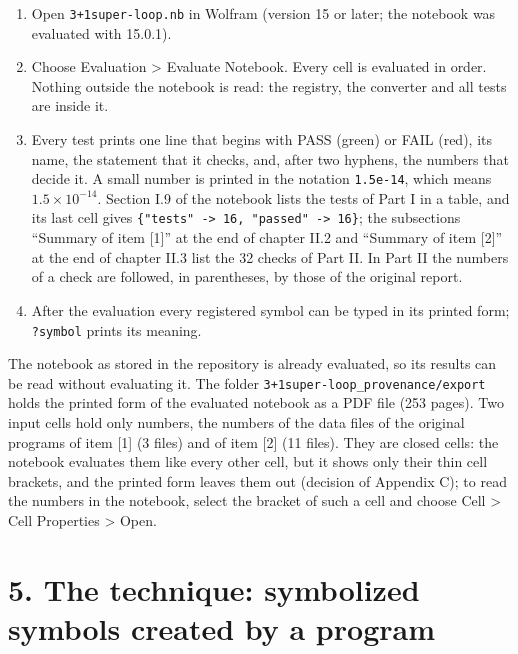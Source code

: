 \documentclass[
  10pt,
]{article}
\providecommand{\tightlist}{%
  \setlength{\itemsep}{0pt}\setlength{\parskip}{0pt}}
\begin{document}
\begin{enumerate}
\def\labelenumi{\arabic{enumi}.}
\tightlist
\item
  Open \texttt{3+1super-loop.nb} in Wolfram (version 15 or later; the
  notebook was evaluated with 15.0.1).
\item
  Choose Evaluation \textgreater{} Evaluate Notebook. Every cell is
  evaluated in order. Nothing outside the notebook is read: the
  registry, the converter and all tests are inside it.
\item
  Every test prints one line that begins with PASS (green) or FAIL
  (red), its name, the statement that it checks, and, after two hyphens,
  the numbers that decide it. A small number is printed in the notation
  \texttt{1.5e-14}, which means \(1.5\times10^{-14}\). Section I.9 of
  the notebook lists the tests of Part I in a table, and its last cell
  gives
  \texttt{\{"tests"\ -\textgreater{}\ 16,\ "passed"\ -\textgreater{}\ 16\}};
  the subsections ``Summary of item {[}1{]}'' at the end of chapter II.2
  and ``Summary of item {[}2{]}'' at the end of chapter II.3 list the 32
  checks of Part II. In Part II the numbers of a check are followed, in
  parentheses, by those of the original report.
\item
  After the evaluation every registered symbol can be typed in its
  printed form; \texttt{?symbol} prints its meaning.
\end{enumerate}

The notebook as stored in the repository is already evaluated, so its
results can be read without evaluating it. The folder
\texttt{3+1super-loop\_provenance/export} holds the printed form of the
evaluated notebook as a PDF file (253 pages). Two input cells hold only
numbers, the numbers of the data files of the original programs of item
{[}1{]} (3 files) and of item {[}2{]} (11 files). They are closed cells:
the notebook evaluates them like every other cell, but it shows only
their thin cell brackets, and the printed form leaves them out (decision
of Appendix C); to read the numbers in the notebook, select the bracket
of such a cell and choose Cell \textgreater{} Cell Properties
\textgreater{} Open.

\hypertarget{the-technique-symbolized-symbols-created-by-a-program}{%
\section{5. The technique: symbolized symbols created by a
program}\label{the-technique-symbolized-symbols-created-by-a-program}}
\end{document}
